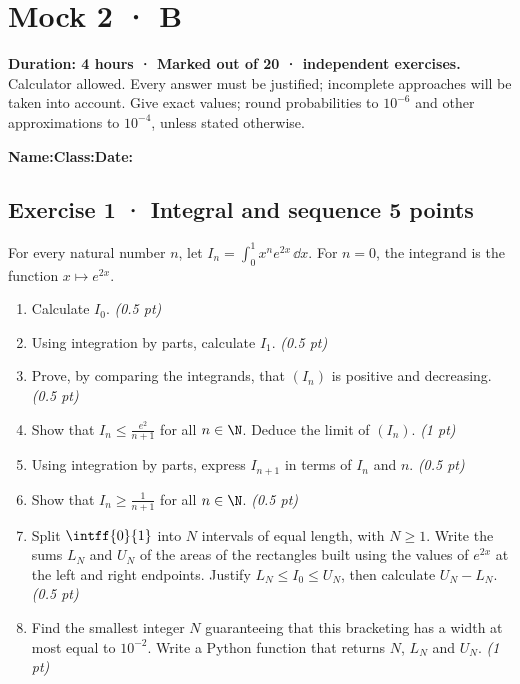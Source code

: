\fi

\fi

\ifmxteacher

\mxnewpage{}\label{sujet:8-4}

\section*{Mock 2 · B}


\textbf{Duration: 4 hours · Marked out of 20 ·  independent exercises.}\\Calculator allowed. Every answer must be justified; incomplete approaches will be taken into account. Give exact values; round probabilities to $10^{-6}$ and other approximations to $10^{-4}$, unless stated otherwise.

\smallskip\textbf{Name:}\enspace\dotfill\quad\textbf{Class:}\enspace\dotfill\quad\textbf{Date:}\enspace\dotfill

\subsection*{Exercise 1 · Integral and sequence \hfill 5 points}For every natural number $n$, let $I_n=\displaystyle\int_0^1x^ne^{2x}\,\dd x$. For $n=0$, the integrand is the function $x\mapsto e^{2x}$.

\begin{enumerate}

\item Calculate $I_0$. \hfill\textit{(0.5 pt)}

\item Using integration by parts, calculate $I_1$. \hfill\textit{(0.5 pt)}

\item Prove, by comparing the integrands, that $(I_n)$ is positive and decreasing. \hfill\textit{(0.5 pt)}

\item Show that $I_n\le\frac{e^{2}}{n+1}$ for all $n\in\N$. Deduce the limit of $(I_n)$. \hfill\textit{(1 pt)}

\item Using integration by parts, express $I_{n+1}$ in terms of $I_n$ and $n$. \hfill\textit{(0.5 pt)}

\item Show that $I_n\ge\frac1{n+1}$ for all $n\in\N$. \hfill\textit{(0.5 pt)}

\item Split $\intff{0}{1}$ into $N$ intervals of equal length, with $N\ge1$. Write the sums $L_N$ and $U_N$ of the areas of the rectangles built using the values of $e^{2x}$ at the left and right endpoints. Justify $L_N\le I_0\le U_N$, then calculate $U_N-L_N$. \hfill\textit{(0.5 pt)}

\item Find the smallest integer $N$ guaranteeing that this bracketing has a width at most equal to $10^{-2}$. Write a Python function that returns $N$, $L_N$ and $U_N$. \hfill\textit{(1 pt)}

\end{enumerate}

